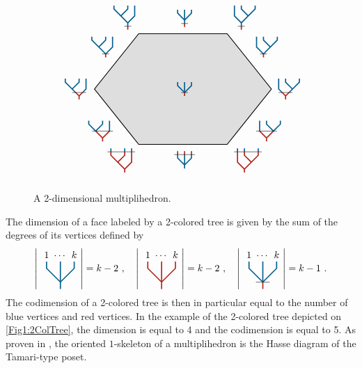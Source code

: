 \documentclass[twoside, 12pt]{amsart}
\theoremstyle{remark}
\begin{document}
\begin{figure}[h]
\[
\begin{tikzpicture}[xscale=0.8,yscale=1]
\draw[thick] (-2,2)--(2,2)--(4,0)--(2,-2)--(-2,-2)--(-4,0)--cycle;
\draw[fill, opacity=0.12] (-2,2)--(2,2)--(4,0)--(2,-2)--(-2,-2)--(-4,0)--cycle;
\draw (-2,2) node[above left] {$\TreeLa$};
\draw (2,2) node[above right] {$\TreeRa$};
\draw (-2,-2) node[below left] {$\TreeLc$};
\draw (2,-2) node[below right] {$\TreeRc$};
\draw (-4.2,0) node[left] {$\TreeLb$};
\draw (4,0) node[right] {$\TreeRb$};
\draw (-3,1) node[above left] {$\TreeLab$};
\draw (-3,-1) node[below left] {$\TreeLbc$};
\draw (3,1) node[above right] {$\TreeRab$};
\draw (3,-1) node[below right] {$\TreeRbc$};
\draw (0,2.1) node[above] {$\TreeCa$};
\draw (0,-2.1) node[below] {$\TreeCb$};
\draw (0,0) node  {$\TreeCab$};
\end{tikzpicture}
\]
\caption{A 2-dimensional multiplihedron.}
\label{Fig4:J3}
\end{figure}

The dimension of a face labeled by a 2-colored tree is given by the sum of the degrees of its vertices defined by 
\[
\left|{\vcenter{\hbox{
\begin{tikzpicture}[scale=0.5]
\draw[very thick, MidnightBlue] (0,-0.5) -- (0,1.5);
\draw[very thick, MidnightBlue] (0,0) -- (-1,1)--(-1,1.5);
\draw[very thick, MidnightBlue] (0,0) -- (1,1)--(1,1.5);
\draw (1,1.5) node[above] {$k$};
\draw (-1,1.5) node[above] {$1$};
\draw (0,1.5) node[above] {$\cdots$};
\end{tikzpicture}}}}\right|=k-2\ , \quad 
\left|{\vcenter{\hbox{
\begin{tikzpicture}[scale=0.5]
\draw[very thick, BrickRed] (0,-0.5) -- (0,1.5);
\draw[very thick, BrickRed] (0,0) -- (-1,1)--(-1,1.5);
\draw[very thick, BrickRed] (0,0) -- (1,1)--(1,1.5);
\draw (1,1.5) node[above] {$k$};
\draw (-1,1.5) node[above] {$1$};
\draw (0,1.5) node[above] {$\cdots$};
\end{tikzpicture}}}}\right|=k-2\ , \quad 
\left|{\vcenter{\hbox{
\begin{tikzpicture}[scale=0.5]
\draw[very thick, MidnightBlue] (0,0) -- (0,1.5);
\draw[very thick, MidnightBlue] (0,0) -- (-1,1)--(-1,1.5);
\draw[very thick, MidnightBlue] (0,0) -- (1,1)--(1,1.5);
\draw[very thick, BrickRed] (0,0) -- (0,-0.5);
\draw (-0.5,0)--(0.5,0);
\draw (1,1.5) node[above] {$k$};
\draw (-1,1.5) node[above] {$1$};
\draw (0,1.5) node[above] {$\cdots$};
\end{tikzpicture}}}}\right|=k-1\ .
\]
The codimension of a 2-colored tree is then in particular equal to the number of blue vertices and red vertices. 
In the example of the 2-colored tree depicted on \cref{Fig1:2ColTree}, the dimension is equal to 4 and the codimension is equal to 5. 
As proven in \cite[Proposition 117]{CP22}, the oriented $1$-skeleton of a multiplihedron is the Hasse diagram of the Tamari-type poset. 
\end{document}
